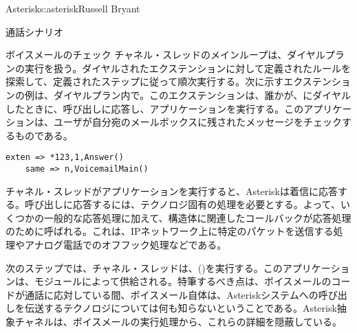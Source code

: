 \begin{aosachapter}{Asterisk}{s:asterisk}{Russell Bryant}
\begin{aosasect1}{通話シナリオ}
\begin{aosasect2}{ボイスメールのチェック}
チャネル・スレッドのメインループは、ダイヤルプランの実行を扱う。ダイヤルされたエクステンションに対して定義されたルールを探索して、定義されたステップに従って順次実行する。次に示すエクステンションの例は、ダイヤルプラン内で。このエクステンションは、誰かが、にダイヤルしたときに、呼び出しに応答し、アプリケーションを実行する。このアプリケーションは、ユーザが自分宛のメールボックスに残されたメッセージをチェックするものである。

\begin{verbatim}
exten => *123,1,Answer()
    same => n,VoicemailMain()
\end{verbatim}

\noindent チャネル・スレッドがアプリケーションを実行すると、Asteriskは着信に応答する。呼び出しに応答するには、テクノロジ固有の処理を必要とする。よって、いくつかの一般的な応答処理に加えて、構造体に関連したコールバックが応答処理のために呼ばれる。これは、IPネットワーク上に特定のパケットを送信する処理やアナログ電話でのオフフック処理などである。

次のステップでは、チャネル・スレッドは、()を実行する。このアプリケーションは、モジュールによって供給される。特筆するべき点は、ボイスメールのコードが通話に応対している間、ボイスメール自体は、Asteriskシステムへの呼び出しを伝送するテクノロジについては何も知らないということである。Asterisk抽象チャネルは、ボイスメールの実行処理から、これらの詳細を隠蔽している。


\end{aosasect2}
\end{aosasect1}
\end{aosachapter}

